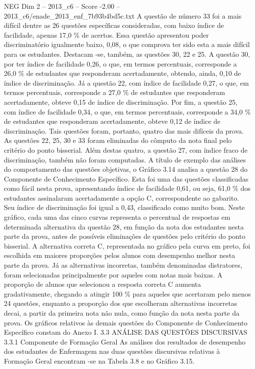 \begin{textsample}{NEG Dim 2 – 2013\_c6 – Score -2.00 – 2013\_c6/enade\_2013\_enf\_7b93b4bd5c.txt}
A questão de número 33 foi a mais difícil dentre as 26 questões específicas consideradas, com baixo índice de facilidade, apenas 17,0 \% de acertos.
Essa questão apresentou poder discriminatório igualmente baixo, 0,08, o que comprova ter sido esta a mais difícil para os estudantes.
Destacam -se, também, as questões 30, 22 e 25.
A questão 30, por ter índice de facilidade 0,26, o que, em termos percentuais, corresponde a 26,0 \% de estudantes que responderam acertadamente, obtendo, ainda, 0,10 de índice de discriminação.
Já a questão 22, com índice de facilidade 0,27, o que, em termos percentuais, corresponde a 27,0 \% de estudantes que responderam acertadamente, obteve 0,15 de índice de discriminação.
Por fim, a questão 25, com índice de facilidade 0,34, o que, em termos percentuais, corresponde a 34,0 \% de estudantes que responderam acertadamente, obteve 0,12 de índice de discriminação.
Tais questões foram, portanto, quatro das mais difíceis da prova.
As questões 22, 25, 30 e 33 foram eliminadas do cômputo da nota final pelo critério do ponto bisserial.
Além destas quatro, a questão 27, com índice fraco de discriminação, também não foram computadas.
A título de exemplo das análises do comportamento das questões objetivas, o Gráfico 3.14 analisa a questão 28 do Componente de Conhecimento Específico.
Esta foi uma das questões classificadas como fácil nesta prova, apresentando índice de facilidade 0,61, ou seja, 61,0 \% dos estudantes assinalaram acertadamente a opção C, correspondente ao gabarito.
Seu índice de discriminação foi igual a 0,43, classificado como muito bom.
Neste gráfico, cada uma das cinco curvas representa o percentual de respostas em determinada alternativa da questão 28, em função da nota dos estudantes nesta parte da prova, antes de possíveis eliminações de questões pelo critério do ponto bisserial.
A alternativa correta C, representada no gráfico pela curva em preto, foi escolhida em maiores proporções pelos alunos com desempenho melhor nesta parte da prova.
Já as alternativas incorretas, também denominadas distratores, foram selecionadas principalmente por aqueles com notas mais baixas.
A proporção de alunos que selecionou a resposta correta C aumenta gradativamente, chegando a atingir 100 \% para aqueles que acertaram pelo menos 24 questões, enquanto a proporção dos que escolheram alternativas incorretas decai, a partir da primeira nota não nula, como função da nota nesta parte da prova.
Os gráficos relativos às demais questões do Componente de Conhecimento Específico constam do Anexo I. 3.3 ANÁLISE DAS QUESTÕES DISCURSIVAS 3.3.1 Componente de Formação Geral As análises dos resultados de desempenho dos estudantes de Enfermagem nas duas questões discursivas relativas à Formação Geral encontram -se na Tabela 3.8 e no Gráfico 3.15.

\end{textsample}
